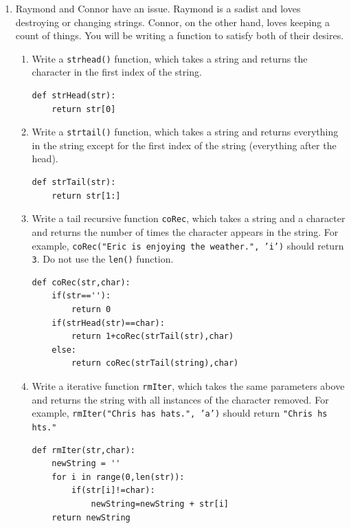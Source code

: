 \documentclass[11pt]{article}
\newenvironment{answer}{\large\lstset{basicstyle=\large}\color{white}}{}
\newenvironment{answer}{\large\lstset{basicstyle=\large}\color{red}}{}
\begin{document}
\begin{enumerate}
\item
Raymond and Connor have an issue.
Raymond is a sadist and loves destroying or changing strings.
Connor, on the other hand, loves keeping a count of things.
You will be writing a function to satisfy both of their desires.
\begin{enumerate}
\item
Write a \texttt{strhead()} function, which takes a string and returns the character in the first index of the string.
\begin{answer}
\begin{lstlisting}
def strHead(str):
    return str[0]
\end{lstlisting}
\end{answer}

\item
Write a \texttt{strtail()} function, which takes a string and returns everything in the string except for the first index of the string (everything after the head).
\begin{answer}
\begin{lstlisting}
def strTail(str):
    return str[1:]
\end{lstlisting}
\end{answer}

\item
\label{tailrecursive}
Write a tail recursive function \texttt{coRec}, which takes a string and a character and returns the number of times the character appears in the string.
For example, \texttt{coRec("Eric is enjoying the weather.", 'i')} should return \texttt{3}.
Do not use the \texttt{len()} function.
\begin{answer}
\begin{lstlisting}
def coRec(str,char):
    if(str==''):
        return 0
    if(strHead(str)==char):
        return 1+coRec(strTail(str),char)
    else:
        return coRec(strTail(string),char)
\end{lstlisting}
\end{answer}

\item
\label{iterative}
Write a iterative function \texttt{rmIter}, which takes the same parameters above and returns the string with all instances of the character removed.
For example, \texttt{rmIter("Chris has hats.", 'a')} should return \texttt{"Chris hs hts."}
\begin{answer}
\begin{lstlisting}
def rmIter(str,char):
    newString = ''
    for i in range(0,len(str)):
        if(str[i]!=char):
            newString=newString + str[i]
    return newString
\end{lstlisting}
\end{answer}



\end{enumerate}
\end{enumerate}
\end{document}
